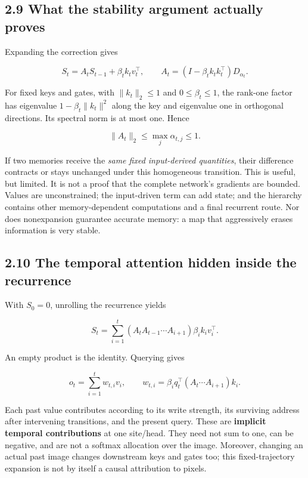 \documentclass[
  11pt,
]{article}
\newcounter{none} %
\let\oldsubsection\subsection
\renewcommand{\subsection}{\Needspace{6\baselineskip}\oldsubsection}
\begin{document}
\subsection{2.9 What the stability argument actually
proves}\label{what-the-stability-argument-actually-proves}

Expanding the correction gives

\[S_t=A_tS_{t-1}+\beta_t k_tv_t^\top,\qquad
A_t=(I-\beta_tk_tk_t^\top)D_{\alpha_t}.\]

For fixed keys and gates, with \(\|k_t\|_2\leq1\) and
\(0\leq\beta_t\leq1\), the rank-one factor has eigenvalue
\(1-\beta_t\|k_t\|^2\) along the key and eigenvalue one in orthogonal
directions. Its spectral norm is at most one. Hence

\[\|A_t\|_2\leq\max_j\alpha_{t,j}\leq1.\]

If two memories receive the \emph{same fixed input-derived quantities},
their difference contracts or stays unchanged under this homogeneous
transition. This is useful, but limited. It is not a proof that the
complete network's gradients are bounded. Values are unconstrained; the
input-driven term can add state; and the hierarchy contains other
memory-dependent computations and a final recurrent route. Nor does
nonexpansion guarantee accurate memory: a map that aggressively erases
information is very stable.

\subsection{2.10 The temporal attention hidden inside the
recurrence}\label{the-temporal-attention-hidden-inside-the-recurrence}

With \(S_0=0\), unrolling the recurrence yields

\[S_t=\sum_{i=1}^{t}(A_tA_{t-1}\cdots A_{i+1})\beta_i k_iv_i^\top.\]

An empty product is the identity. Querying gives

\[o_t=\sum_{i=1}^{t}w_{t,i}v_i,\qquad
w_{t,i}=\beta_iq_t^\top(A_t\cdots A_{i+1})k_i.\]

Each past value contributes according to its write strength, its
surviving address after intervening transitions, and the present query.
These are \textbf{implicit temporal contributions} at one site/head.
They need not sum to one, can be negative, and are not a softmax
allocation over the image. Moreover, changing an actual past image
changes downstream keys and gates too; this fixed-trajectory expansion
is not by itself a causal attribution to pixels.
\end{document}
